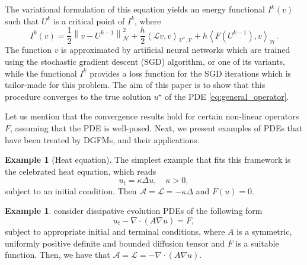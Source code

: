 \documentclass[11pt,a4paper,reqno]{amsart}
\numberwithin{equation}{section}
\theoremstyle{plain}
\theoremstyle{definition}
\newtheorem{example}[theorem]{Example}
\newcommand{\ip}[1]{\left\langle#1\right\rangle}
\newcommand{\cL}{\mathcal{L}}
\newcommand{\norm}[1]{\left\|#1 \right\|} %
\begin{document}
The variational formulation of this equation yields an energy functional $I^k (v)$ such that $U^k$ is a critical point of $I^k$, where
\[
I^k (v) = \frac{1}{2} \norm{v - U^{k - 1}}_{\mathcal{H}}^2 + \frac{h}{2} \ip{\cL v, v}_{\mathcal{V}^*,\mathcal{V}}   + h\ip{F \left( U^{k - 1} \right),v}_{\mathcal H}.
\]
The function $v$ is approximated by artificial neural networks which are trained using the stochastic gradient descent (SGD) algorithm, or one of its variants, while the functional $I^k$ provides a loss function for the SGD iterations which is tailor-made for this problem.
The aim of this paper is to show that this procedure converges to the true solution $u^\star$ of the PDE \eqref{eq:general_operator}.

Let us mention that the convergence results hold for certain non-linear operators $F$, assuming that the PDE is well-posed.
Next, we present examples of PDEs that have been treated by DGFMs, and their applications.

\begin{example}[Heat equation]
The simplest example that fits this framework is the celebrated heat equation, which reads
\[
    u_t = \kappa \Delta u,\quad \kappa>0,
\]
subject to an initial condition.
Then $\mathcal{A} = \cL = - \kappa \Delta$ and $F(u) = 0$.
\end{example}

\begin{example}
\citet{georgoulis2023discrete} consider dissipative evolution PDEs of the following form
\[
    u_t - \nabla \cdot (A \nabla u) = F,
\]
subject to appropriate initial and terminal conditions, where $A$ is a symmetric, uniformly positive definite and bounded diffusion tensor and $F$ is a suitable function.
Then, we have that $\mathcal{A} = \mathcal{L} = - \nabla \cdot (A \nabla u)$.
\end{example}
\end{document}
